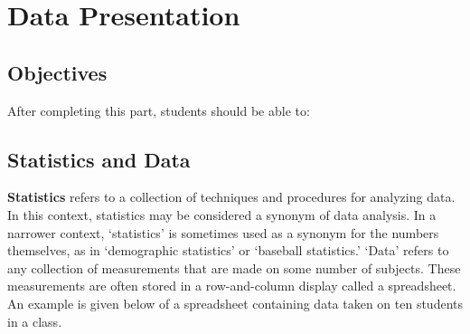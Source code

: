 \documentclass[11pt, chapterprefix=true]{scrbook}\usepackage[]{graphicx}\usepackage[]{color}
\begin{document}
\chapter{Data Presentation}
\label{chap:ch2}

\section{Objectives}

After completing this part, students should be able to:


\section{Statistics and Data}

\textbf{Statistics} refers to a collection of techniques and procedures for analyzing data.  In this context, statistics may be considered a synonym of data analysis.  In a narrower context, `statistics' is sometimes used as a synonym for the numbers themselves, as in `demographic statistics' or `baseball statistics.'
`Data' refers to any collection of measurements that are made on some number of subjects.  These measurements are often stored in a row-and-column display called a spreadsheet.  An example is given below of a spreadsheet containing data taken on ten students in a class.
\end{document}
